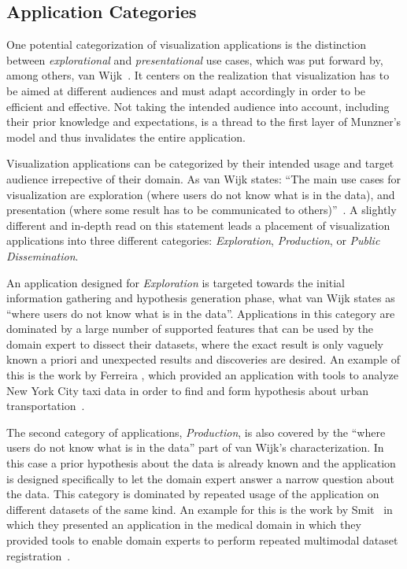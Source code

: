 \subsection{Application Categories} \label{cha:intro:appl:categories}
One potential categorization of visualization applications is the distinction between \emph{explorational} and \emph{presentational} use cases, which was put forward by, among others, van Wijk~\cite{van2005value}.  It centers on the realization that visualization has to be aimed at different audiences and must adapt accordingly in order to be efficient and effective.  Not taking the intended audience into account, including their prior knowledge and expectations, is a thread to the first layer of Munzner's model and thus invalidates the entire application.

Visualization applications can be categorized by their intended usage and target audience irrepective of their domain. As van Wijk states: ``The main use cases for visualization are exploration (where users do not know what is in the data), and presentation (where some result has to be communicated to others)''~\cite{van2005value}.  A slightly different and in-depth read on this statement leads a placement of visualization applications into three different categories: \emph{Exploration}, \emph{Production}, or \emph{Public Dissemination}.

An application designed for \emph{Exploration} is targeted towards the initial information gathering and hypothesis generation phase, what van Wijk states as ``where users do not know what is in the data''.  Applications in this category are dominated by a large number of supported features that can be used by the domain expert to dissect their datasets, where the exact result is only vaguely known a priori and unexpected results and discoveries are desired.  An example of this is the work by Ferreira \etal , which provided an application with tools to analyze New York City taxi data in order to find and form hypothesis about urban transportation~\cite{ferreira2013visual}.

The second category of applications, \emph{Production}, is also covered by the ``where users do not know what is in the data'' part of van Wijk's characterization.  In this case a prior hypothesis about the data is already known and the application is designed specifically to let the domain expert answer a narrow question about the data.  This category is dominated by repeated usage of the application on different datasets of the same kind.  An example for this is the work by Smit \etal\ in which they presented an application in the medical domain in which they provided tools to enable domain experts to perform repeated multimodal dataset registration~\cite{smit14registrationshop}.

